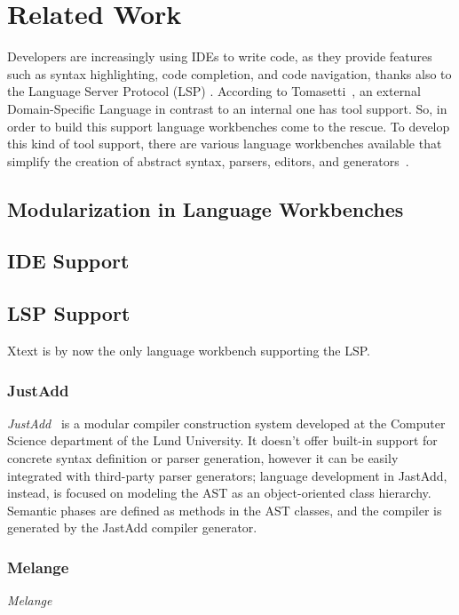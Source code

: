 \chapter{Related Work}\label{chap:RelatedWork}

Developers are increasingly using IDEs to write code, as they provide features such as syntax highlighting, code completion, and code navigation, thanks also to the Language Server Protocol (LSP) \cite{Rodriguez-Echeverria18a}.
According to Tomasetti~\cite{tomassetti_complete_2017}, an external Domain-Specific Language in contrast to an internal one has tool support. So, in order to build this support language workbenches come to the rescue.
To develop this kind of tool support, there are various language workbenches available that simplify the creation of abstract syntax, parsers, editors, and generators~\cite{Fowler05}.

\section{Modularization in Language Workbenches}\label{sec:background:modularization}

\section{IDE Support}\label{sec:background:ide-support}

\section{LSP Support}\label{sec:background:lsp-support}

Xtext is by now the only language workbench supporting the LSP.~\cite{Bunder19a}



\subsection{JustAdd}\label{subsec:background:justadd}

\textit{JustAdd}~\cite{Ekman07b} is a modular compiler construction system developed at the Computer Science department of the Lund University.
It doesn’t offer built-in support for concrete syntax definition or parser generation, however it can be easily integrated with third-party parser generators; language development in JastAdd, instead, is focused on modeling the AST as an object-oriented class hierarchy. Semantic phases are defined as methods in the AST classes, and the compiler is generated by the JastAdd compiler generator.

\subsection{Melange}\label{subsec:background:melange}

\textit{Melange}~\cite{Degueule15}
